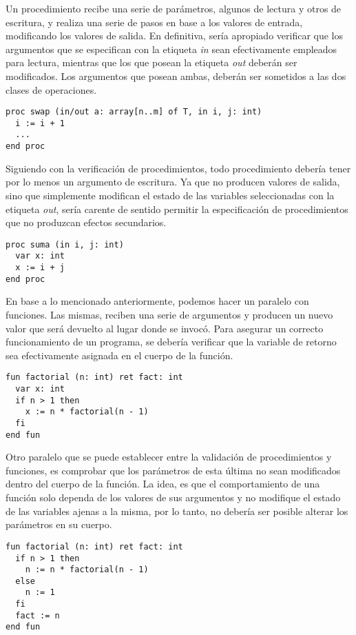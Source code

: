 \documentclass{article}
\begin{document}
Un procedimiento recibe una serie de parámetros, algunos de lectura y otros de escritura, y realiza una serie de pasos en base a los valores de entrada, modificando los valores de salida.
En definitiva, sería apropiado verificar que los argumentos que se especifican con la etiqueta \textit{in} sean efectivamente empleados para lectura, mientras que los que posean la etiqueta \textit{out} deberán ser modificados.
Los argumentos que posean ambas, deberán ser sometidos a las dos clases de operaciones.
\begin{lstlisting}
proc swap (in/out a: array[n..m] of T, in i, j: int)
  i := i + 1
  ...
end proc
\end{lstlisting}

Siguiendo con la verificación de procedimientos, todo procedimiento debería tener por lo menos un argumento de escritura.
Ya que no producen valores de salida, sino que simplemente modifican el estado de las variables seleccionadas con la etiqueta  \textit{out}, sería carente de sentido permitir la especificación de procedimientos que no produzcan efectos secundarios. 
\begin{lstlisting}
proc suma (in i, j: int)
  var x: int
  x := i + j
end proc
\end{lstlisting}

En base a lo mencionado anteriormente, podemos hacer un paralelo con funciones.
Las mismas, reciben una serie de argumentos y producen un nuevo valor que será devuelto al lugar donde se invocó.
Para asegurar un correcto funcionamiento de un programa, se debería verificar que la variable de retorno sea efectivamente asignada en el cuerpo de la función.
\begin{lstlisting}
fun factorial (n: int) ret fact: int
  var x: int
  if n > 1 then
    x := n * factorial(n - 1)
  fi
end fun
\end{lstlisting}

Otro paralelo que se puede establecer entre la validación de procedimientos y funciones, es comprobar que los parámetros de esta última no sean modificados dentro del cuerpo de la función.
La idea, es que el comportamiento de una función solo dependa de los valores de sus argumentos y no modifique el estado de las variables ajenas a la misma, por lo tanto, no debería ser posible alterar los parámetros en su cuerpo.
\begin{lstlisting}
fun factorial (n: int) ret fact: int
  if n > 1 then
    n := n * factorial(n - 1)
  else
    n := 1
  fi
  fact := n
end fun
\end{lstlisting}
\end{document}
